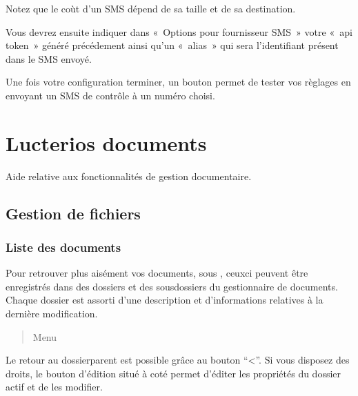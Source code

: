 \documentclass[a4paper,10pt,oneside,french]{sphinxmanual}
\begin{document}
\sphinxAtStartPar
Notez que le coùt d’un SMS dépend de sa taille et de sa destination.

\sphinxAtStartPar
Vous devrez ensuite indiquer dans « Options pour fournisseur SMS » votre « api token » généré précédement
ainsi qu’un « alias » qui sera l’identifiant présent dans le SMS envoyé.

\sphinxAtStartPar
Une fois votre configuration terminer, un bouton  permet de tester vos règlages en envoyant un SMS de contrôle à un numéro choisi.

\sphinxstepscope


\chapter{Lucterios documents}
\label{\detokenize{documents/index:lucterios-documents}}\label{\detokenize{documents/index::doc}}
\sphinxAtStartPar
Aide relative aux fonctionnalités de gestion documentaire.

\sphinxstepscope


\section{Gestion de fichiers}
\label{\detokenize{documents/shared_document:gestion-de-fichiers}}\label{\detokenize{documents/shared_document::doc}}

\subsection{Liste des documents}
\label{\detokenize{documents/shared_document:liste-des-documents}}
\sphinxAtStartPar
Pour retrouver plus aisément vos documents, sous , ceux\sphinxhyphen{}ci peuvent être enregistrés dans des dossiers et des sous\sphinxhyphen{}dossiers du gestionnaire de documents.
Chaque dossier est assorti d’une description et d’informations relatives à la dernière modification.
\begin{quote}

\sphinxAtStartPar
Menu 
\end{quote}

\sphinxAtStartPar
Le retour au dossier\sphinxhyphen{}parent est possible grâce au bouton “\textless{}”.
Si vous disposez des droits, le bouton d’édition situé à coté permet d’éditer les propriétés du dossier actif et de les modifier.
\end{document}
